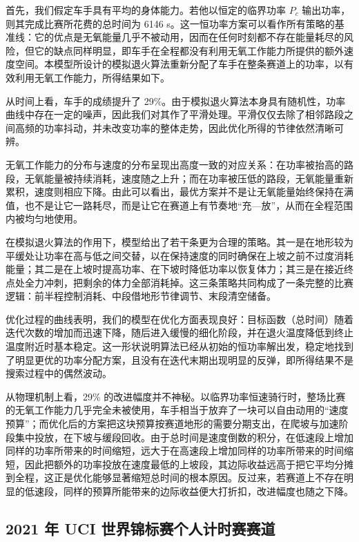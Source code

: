\documentclass[11pt,a4paper]{ctexart}
\begin{document}
首先，我们假定车手具有平均的身体能力。若他以恒定的临界功率 $P_c$ 输出功率，则其完成比赛所花费的总时间为 6146 s。这一恒功率方案可以看作所有策略的基准线：它的优点是无氧能量几乎不被动用，因而在任何时刻都不存在能量耗尽的风险，但它的缺点同样明显，即车手在全程都没有利用无氧工作能力所提供的额外速度空间。本模型所设计的模拟退火算法重新分配了车手在整条赛道上的功率，以有效利用无氧工作能力，所得结果如下。

从时间上看，车手的成绩提升了 29\%。由于模拟退火算法本身具有随机性，功率曲线中存在一定的噪声，因此我们对其作了平滑处理。平滑仅仅去除了相邻路段之间高频的功率抖动，并未改变功率的整体走势，因此优化所得的节律依然清晰可辨。

无氧工作能力的分布与速度的分布呈现出高度一致的对应关系：在功率被抬高的路段，无氧能量被持续消耗，速度随之上升；而在功率被压低的路段，无氧能量重新累积，速度则相应下降。由此可以看出，最优方案并不是让无氧能量始终保持在满值，也不是让它一路耗尽，而是让它在赛道上有节奏地“充—放”，从而在全程范围内被均匀地使用。

在模拟退火算法的作用下，模型给出了若干条更为合理的策略。其一是在地形较为平缓处让功率在高与低之间交替，以在保持速度的同时确保在上坡之前不过度消耗能量；其二是在上坡时提高功率、在下坡时降低功率以恢复体力；其三是在接近终点处全力冲刺，把剩余的体力全部消耗掉。这三条策略共同构成了一条完整的比赛逻辑：前半程控制消耗、中段借地形节律调节、末段清空储备。

优化过程的曲线表明，我们的模型在优化方面表现良好：目标函数（总时间）随着迭代次数的增加而迅速下降，随后进入缓慢的细化阶段，并在退火温度降低到终止温度附近时基本稳定。这一形状说明算法已经从初始的恒功率解出发，稳定地找到了明显更优的功率分配方案，且没有在迭代末期出现明显的反弹，即所得结果不是搜索过程中的偶然波动。

从物理机制上看，29\% 的改进幅度并不神秘。以临界功率恒速骑行时，整场比赛的无氧工作能力几乎完全未被使用，车手相当于放弃了一块可以自由动用的“速度预算”；而优化后的方案把这块预算按赛道地形的需要分期支出，在爬坡与加速阶段集中投放，在下坡与缓段回收。由于总时间是速度倒数的积分，在低速段上增加同样的功率所带来的时间缩短，远大于在高速段上增加同样的功率所带来的时间缩短，因此把额外的功率投放在速度最低的上坡段，其边际收益远高于把它平均分摊到全程，这正是优化能够显著缩短总时间的根本原因。反过来，若赛道上不存在明显的低速段，同样的预算所能带来的边际收益便大打折扣，改进幅度也随之下降。

\subsection{2021 年 UCI 世界锦标赛个人计时赛赛道}
\end{document}
